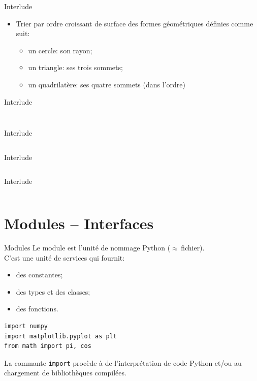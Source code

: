 \documentclass[dvipsnames]{beamer}
\def\interlude{
\plain{Interlude\\[1em]
    \centerline{\decothreeleft\;\rotatebox[origin=c]{180}{\decothreeleft}}
}}
\begin{document}
\interlude

\begin{frame}
    [fragile]{Interlude}
    \begin{itemize}
        \item Trier par ordre croissant de surface des formes géométriques
              définies comme suit:
              \begin{itemize}
                  \item un cercle: son rayon;
                  \item un triangle: ses trois sommets;
                  \item un quadrilatère: ses quatre sommets (dans l'ordre)
              \end{itemize}
    \end{itemize}

\end{frame}

\begin{frame} [fragile]{Interlude}
    \inputminted[lastline=9, fontsize=\scriptsize]{python3}{code/interlude_03_2.py}
    \inputminted[firstline=15, lastline=20, fontsize=\scriptsize]{python3}{code/interlude_03_2.py}
\end{frame}
\begin{frame} [fragile]{Interlude}
    \inputminted[firstline=23, lastline=37, fontsize=\scriptsize]{python3}{code/interlude_03_2.py}
\end{frame}
\begin{frame} [fragile]{Interlude}
    \inputminted[firstline=40, lastline=55, fontsize=\scriptsize]{python3}{code/interlude_03_2.py}
\end{frame}
\begin{frame} [fragile]{Interlude}
    \inputminted[firstline=58, lastline=72, fontsize=\scriptsize]{python3}{code/interlude_03_2.py}
\end{frame}


\section{Modules -- Interfaces}

\begin{frame}
    [fragile]{Modules}
    Le module est l'unité de nommage Python ($\approx$\,fichier).\\
    C'est une \alert{unité de services} qui fournit:
    \begin{itemize}
        \item des constantes;
        \item des types et des classes;
        \item des fonctions.
    \end{itemize}

    \begin{verbatim}
import numpy
import matplotlib.pyplot as plt
from math import pi, cos
\end{verbatim}

    La commante \texttt{import} procède à de l'interprétation de code Python
    et/ou au chargement de bibliothèques compilées.
\end{frame}
\end{document}
